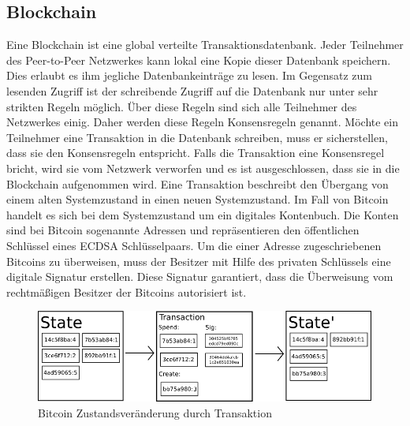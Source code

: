 \subsection{Blockchain}
Eine Blockchain ist eine global verteilte Transaktionsdatenbank. Jeder Teilnehmer des Peer-to-Peer Netzwerkes kann lokal eine Kopie dieser Datenbank speichern. Dies erlaubt es ihm jegliche Datenbankeinträge zu lesen. Im Gegensatz zum lesenden Zugriff ist der schreibende Zugriff auf die Datenbank nur unter sehr strikten Regeln möglich. Über diese Regeln sind sich alle Teilnehmer des Netzwerkes einig. Daher werden diese Regeln Konsensregeln genannt. Möchte ein Teilnehmer eine Transaktion in die Datenbank schreiben, muss er sicherstellen, dass sie den Konsensregeln entspricht. Falls die Transaktion eine Konsensregel bricht, wird sie vom Netzwerk verworfen und es ist ausgeschlossen, dass sie in die Blockchain aufgenommen wird. Eine Transaktion beschreibt den Übergang von einem alten Systemzustand in einen neuen Systemzustand.
Im Fall von Bitcoin handelt es sich bei dem Systemzustand um ein digitales Kontenbuch. Die Konten sind bei Bitcoin sogenannte Adressen und repräsentieren den öffentlichen Schlüssel eines ECDSA Schlüsselpaars. Um die einer Adresse zugeschriebenen Bitcoins zu überweisen, muss der Besitzer mit Hilfe des privaten Schlüssels eine digitale Signatur erstellen. Diese Signatur garantiert, dass die Überweisung vom rechtmäßigen Besitzer der Bitcoins autorisiert ist.

\begin{figure}[H]
\centering
\includegraphics[width=1\linewidth]{Figures/BTC_statetransition_ETH_white_paper}
\decoRule
\caption{Bitcoin Zustandsveränderung durch Transaktion \cite{ethereum_white_paper}}
\label{fig:BTC_statetransition_ETH_white_paper}
\end{figure}

